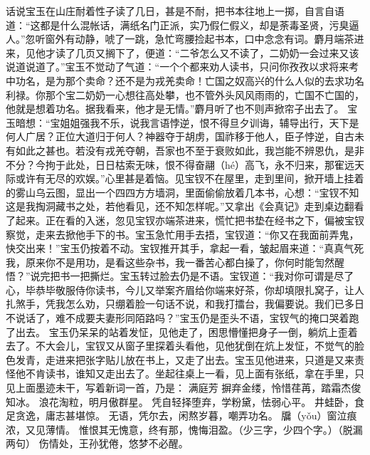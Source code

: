 \documentclass[12pt,oneside]{book}
\begin{document}
话说宝玉在山庄耐着性子读了几日，甚是不耐，把书本往地上一掷，自言自语道：“这都是什么混帐话，满纸名门正派，实乃假仁假义，却是荼毒圣贤，污臭逼人。”忽听窗外有动静，唬了一跳，急忙弯腰捡起书本，口中念念有词。麝月端茶进来，见他才读了几页又搁下了，便道：“二爷怎么又不读了，二奶奶一会过来又该说道说道了。”宝玉不觉动了气道：“一个个都来劝人读书，只问你孜孜以求将来考中功名，是为那个卖命？还不是为戎羌卖命！亡国之奴高兴的什么人似的去求功名利禄。你那个宝二奶奶一心想往高处攀，也不管外头风风雨雨的，亡国不亡国的，他就是想着功名。据我看来，他才是无情。”麝月听了也不则声掀帘子出去了。
宝玉暗想：“宝姐姐强我不乐，说我言语悖逆，恨不得旦夕训诲，辅导出行，天下是何人广居？正位大道归于何人？神器夺于胡虏，国祚移于他人，臣子悖逆，自古未有如此之甚也。若没有戎羌夺朝，吾家也不至于衰败如此，我岂能不辨恩仇，是非不分？今拘于此处，日日枯索无味，恨不得奋翮（hé）高飞，永不归来，那寉远天际或许有无尽的欢娱。”心里甚是着恼。见宝钗不在屋里，走到里间，掀开墙上挂着的雾山乌云图，显出一个四四方方墙洞，里面偷偷放着几本书，心想：“宝钗不知这是我掏洞藏书之处，若他看见，还不知怎样呢。”又拿出《会真记》走到桌边翻看了起来。正在看的入迷，忽见宝钗亦端茶进来，慌忙把书垫在经书之下，偏被宝钗察觉，走来去掀他手下的书。宝玉急忙用手去捂，宝钗道：“你又在我面前弄鬼，快交出来！”宝玉仍按着不动。宝钗推开其手，拿起一看，皱起眉来道：“真真气死我，原来你不是用功，是看这些杂书，我一番苦心都白操了，你何时能訇然醒悟？”说完把书一把撕烂。宝玉转过脸去仍是不语。宝钗道：“我对你可谓是尽了心，毕恭毕敬服侍你读书，今儿又举案齐眉给你端来好茶，你却填限扎窝子，让人扎煞手，凭我怎么劝，只绷着脸一句话不说，和我打擂台，我偏要说。我们已多日不说话了，难不成要夫妻形同陌路吗？”宝玉仍是歪头不语，宝钗气的掩口哭着跑了出去。
宝玉仍呆呆的站着发怔，见他走了，困思懵懂把身子一倒，躺炕上歪着去了。不大会儿，宝钗又从窗子里探着头看他，见他犹倒在炕上发怔，不觉气的脸色发青，走进来把张字贴儿放在书上，又走了出去。宝玉见他进来，只道是又来责怪他不肯读书，谁知又走出去了。坐起往桌上一看，见上面有张纸，拿在手里，只见上面墨迹未干，写着新词一首，乃是：
满庭芳 
摒弃金缕，怜惜荏苒，踏霜杰俊知冰。
浪花淘粒，明月傲群星。
凭自轻择堕弃，学粉黛，怯弱心平。
井蛙卧，食足贪逸，庸志甚堪惊。
无语，凭尔去，闲熬岁暮，嘲弄功名。
牖（yǒu）窗泣痕浓，又见薄情。          
惟恨其无愧意，终有那，愧悔泪盈。（少三字，少四个字。）（脱漏两句）
伤情处，王孙犹倦，悠梦不必醒。
\end{document}
